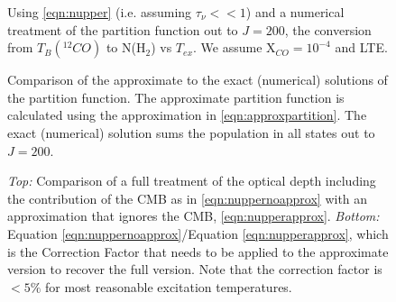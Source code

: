 \documentclass[preprint]{aastex}
\newcommand{\dv}{\ensuremath{\textrm{d}v}}
\begin{document}

\begin{figure}
  \caption{Using \eqref{eqn:nupper} (i.e. assuming $\tau_\nu << 1$) and a numerical treatment of 
  the partition function out to $J=200$, the conversion from $T_B(^{12}CO)$ to N(H$_2$) vs $T_{ex}$.  
  We assume X$_{CO} = 10^{-4}$ and LTE.}
\end{figure}

\begin{figure}
  \caption{Comparison of the approximate to the exact (numerical) solutions of
  the partition function.  The approximate partition function is calculated
  using the approximation in \eqref{eqn:approxpartition}.  The exact
  (numerical) solution sums the population in all states out to $J=200$.}
\end{figure}

\begin{figure}
  \label{fig:cmbcorrection}
  \caption{{\it Top:} Comparison of a full treatment of the optical depth
  including the contribution of the CMB as in \eqref{eqn:nuppernoapprox}
  with an approximation that ignores the CMB, \eqref{eqn:nupperapprox}.
  {\it Bottom:} Equation \eqref{eqn:nuppernoapprox}/Equation
  \eqref{eqn:nupperapprox}, which is the Correction Factor that needs to be
  applied to the approximate version to recover the full version.  Note that
  the correction factor is $<5\%$ for most reasonable excitation temperatures.  
  }
\end{figure}
\end{document}

